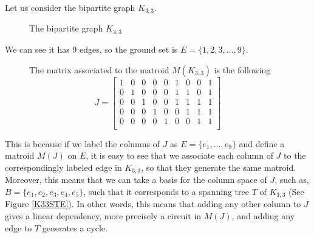 \begin{exmp}
    Let us consider the bipartite graph $K_{3,3}$.
\begin{figure}[H]
\centering
{}
    \caption{The bipartite graph $K_{3,3}$}
    \label{fig:enter-label}
\end{figure}

We can see it has 9 edges, so the ground set is $E=\{1,2,3, \dots, 9\} $.

\begin{figure}[H]
The matrix associated to the matroid $M(K_{3,3})$ is the following
$$J = \begin{bmatrix}
    1 & 0 & 0 & 0 & 0 & 1 & 0 & 0 & 1\\
    0 & 1 & 0 & 0 & 0 & 1 & 1 & 0 & 1\\
    0 & 0 & 1 & 0 & 0 & 1 & 1 & 1 & 1\\
    0 & 0 & 0 & 1 & 0 & 0 & 1 & 1 & 1\\
    0 & 0 & 0 & 0 & 1 & 0 & 0 & 1 & 1\\
\end{bmatrix}$$
\end{figure}

This is because if we label the columns of $J$ as $E = \{e_1,\dots, e_9\}$ and define a matroid $M(J)$ on $E$, it is easy to see that we associate each column of $J$ to the correspondingly labeled edge in $K_{3,3}$, so that they generate the same matroid. Moreover, this means that we can take a basis for the column space of $J$, such as, $B = \{e_1, e_2, e_3, e_4, e_5\}$, such that it corresponds to a spanning tree $T$ of $K_{3,3}$ (See Figure \ref{K33STE}). In other words, this means that adding any other column to $J$ gives a linear dependency, more precisely a circuit in $M(J)$, and adding any edge to $T$ generates a cycle.


\end{exmp}
